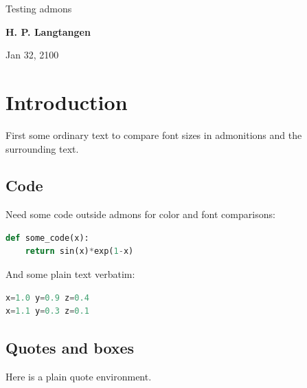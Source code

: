 \documentclass[%
oneside,                 %
final,                   %
10pt]{article}
\begin{document}
\newcommand{\exercisesection}[1]{\subsection*{#1}}


\thispagestyle{empty}
\begin{center}
{\LARGE\bf
\begin{spacing}{1.25}
Testing admons
\end{spacing}
}
\end{center}
\begin{center}
{\bf H. P. Langtangen${}^{}$} \\ [0mm]
\end{center}
\begin{center}
\end{center}
    
\begin{center}
Jan 32, 2100
\end{center}
\vspace{1cm}
\section{Introduction}
First some ordinary text to compare font sizes in admonitions
and the surrounding text.
\subsection{Code}
Need some code outside admons for color and font comparisons:
\begin{lstlisting}[language=Python,style=simple,xleftmargin=2mm]
def some_code(x):
    return sin(x)*exp(1-x)

\end{lstlisting}

And some plain text verbatim:
\begin{lstlisting}[language=Python,style=simple,xleftmargin=2mm]
x=1.0 y=0.9 z=0.4
x=1.1 y=0.3 z=0.1

\end{lstlisting}

\subsection{Quotes and boxes}
Here is a plain quote environment.
\end{document}
